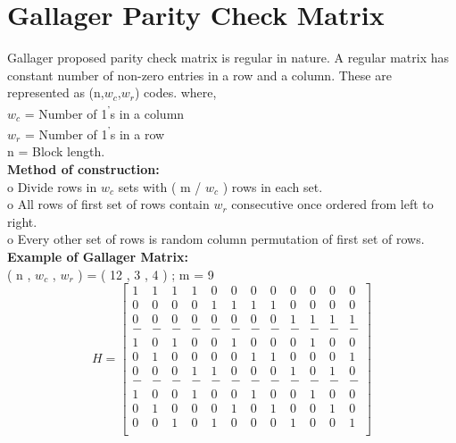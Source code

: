 \section{Gallager Parity Check Matrix}
Gallager proposed parity check matrix is regular in nature\cite{1}. A regular matrix has constant number of non-zero entries in a row and a column. 
These are represented as (n,$w_c$,$w_r$) codes. where,
\\
$w_c$ = Number of 1\textsuperscript{'}s in a column 
\\
$w_r$ = Number of 1\textsuperscript{'}s in a row 
\\
n = Block length. \\
\textbf{Method of construction:} \\
\noindent o Divide rows in $w_c$ sets with ( m / $w_c$ ) rows in each set.  \\
o All rows of first set of rows contain $w_r$ consecutive once ordered from left to right. \\
o Every other set of rows is random column permutation of first set of rows. \\
\textbf{Example of Gallager Matrix:} \\
( n , $w_c$ , $w_r$ ) = ( 12 , 3 , 4 ) ; m = 9 
\[
 H=
 \left[ \begin{array}{cccccccccccc}
1 &  1 &  1  & 1 &  0 & 0 & 0 & 0 & 0 & 0 & 0 & 0 \\
0 & 0 & 0 & 0 & 1 &  1 &  1  & 1 & 0 & 0 & 0 & 0 \\
0 & 0 & 0 & 0 & 0 & 0 & 0 & 0 & 1 &  1 &  1  & 1 \\
-& - & - & - & - & - & - & - & - &  - &  -  & -\\ 
1 &  0 &  1  & 0 &  0 & 1 & 0 & 0 & 0 & 1 & 0 & 0 \\
0 & 1 & 0 & 0 & 0 &  0 &  1  & 1 & 0 & 0 & 0 & 1 \\
0 & 0 & 0 & 1 & 1 & 0 & 0 & 0 & 1 &  0 &  1  &  0\\
-& - & - & - & - & - & - & - & - &  - &  -  & -\\ 
1 & 0 & 0 & 1 & 0 & 0 & 1 & 0 & 0 & 1 & 0 & 0 \\
0 & 1 & 0 & 0 & 0 & 1 & 0 & 1 & 0 & 0 & 1 & 0 \\
0 & 0 & 1 & 0 & 1 & 0 & 0 & 0 & 1 & 0 & 0 & 1 \\ \end{array} \right]  
\]


